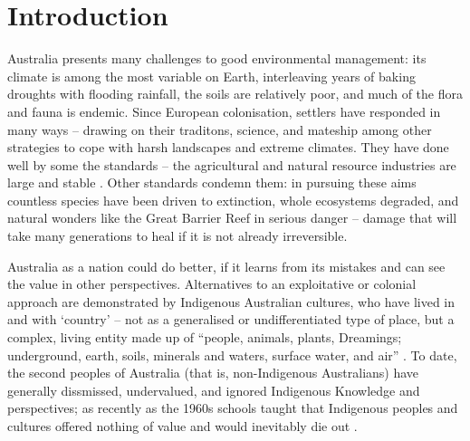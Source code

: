 \chapter{Introduction}
\label{ch:introduction}


%




Australia presents many challenges to good environmental management: its
climate is among the most variable on Earth, interleaving years of baking
droughts with flooding rainfall, the soils are relatively poor, and much of
the flora and fauna is endemic.
%
Since European colonisation, settlers have responded in many ways --
drawing on their traditons, science, and mateship among other strategies to cope
with harsh landscapes and extreme climates.
%
They have done well by some the standards -- the agricultural and natural
resource industries are large and stable .  Other standards condemn
them: in pursuing these aims countless species have been driven to extinction,
whole ecosystems degraded, and natural wonders like the Great Barrier Reef
in serious danger -- damage that will take many generations to heal if it is
not already irreversible.

Australia as a nation could do better, if it learns from its mistakes and can
see the value in other perspectives.  Alternatives to an exploitative or
colonial approach are demonstrated by Indigenous Australian cultures, who
have lived in and with `country' -- not as a generalised or undifferentiated
type of place, but a complex, living entity made up of ``people, animals,
plants, Dreamings; underground, earth, soils, minerals and waters, surface
water, and air'' \citep{birdrose1996}.
%
To date, the second peoples of Australia (that is, non-Indigenous Australians)
have generally dissmissed, undervalued, and ignored Indigenous Knowledge
and perspectives; as recently as the 1960s schools taught that Indigenous
peoples and cultures offered nothing of value and would inevitably die out
\citep{flannery1994}.



